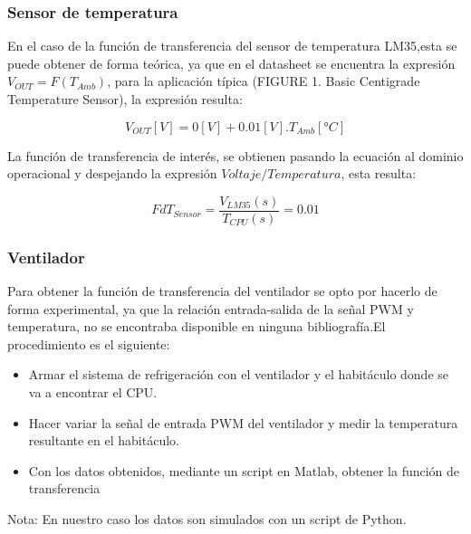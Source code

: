 \documentclass[12pt]{article}
\begin{document}
		\subsubsection{Sensor de temperatura}
		En el caso de la función de transferencia del sensor de temperatura LM35,esta se puede obtener de forma teórica, ya que en el datasheet se encuentra la expresión $V_{OUT}=F(T_{Amb})$, para la aplicación típica (FIGURE 1. Basic Centigrade Temperature Sensor), la expresión resulta:
		
		\begin{equation}
			V_{OUT}[V]= 0[V]+0.01[V].T_{Amb}[°C]
		\end{equation}
		
		La función de transferencia de interés, se obtienen pasando la ecuación al dominio operacional y despejando la expresión $Voltaje/Temperatura$, esta resulta:
		
		\begin{equation}
			FdT_{Sensor}=\frac{V_{LM35}(s)}{T_{CPU}(s)}=0.01
		\end{equation}
		
		\subsubsection{Ventilador}
		Para obtener la función de transferencia del ventilador se opto por hacerlo de forma experimental, ya que la relación entrada-salida de la señal PWM y temperatura, no se encontraba disponible en ninguna bibliografía.El procedimiento es el siguiente:
		
		\begin{itemize}
			\item Armar el sistema de refrigeración con el ventilador y el habitáculo donde se va a encontrar el CPU.
			\item Hacer variar la señal de entrada PWM del ventilador y medir la temperatura resultante en el habitáculo.
			\item Con los datos obtenidos, mediante un script en Matlab, obtener la función de transferencia
		\end{itemize}
		
		Nota: En nuestro caso los datos son simulados con un script de Python.
		
\end{document}
